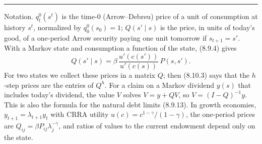 \documentclass[11pt,letterpaper,reqno]{amsart}
\newcommand{\given}{\mid}
\newcommand{\bk}[1]{\textup{\textsc{#1}}}
\begin{document}
\bigskip
\hrule
\bigskip

Notation.  $q^0_t(s^t)$ is the time-0 (Arrow--Debreu) price of a unit of consumption at history $s^t$, normalized by $q^0_0(s_0)=1$; $Q(s'\given s)$ is the
price, in units of today's good, of a one-period Arrow security paying one unit tomorrow if $s_{t+1}=s'$.  With a Markov state and
consumption a function of the state, \bk{(8.9.4)} gives
\[
  Q(s'\given s)=\beta\,\frac{u'(c(s'))}{u'(c(s))}\,P(s,s').
\]
For two states we collect these prices in a matrix $Q$; then \bk{(8.10.3)} says that the $h$-step prices are the entries of $Q^h$.  For
a claim on a Markov dividend $y(s)$ that includes today's dividend, the value $V$ solves $V=y+QV$, so $V=(I-Q)^{-1}y$.  This is also the
formula for the natural debt limits \bk{(8.9.13)}.  In growth economies, $y_{t+1}=\lambda_{t+1}y_t$ with CRRA utility $u(c)=c^{1-\gamma}/(1-\gamma)$, the
one-period prices are $Q_{ij}=\beta P_{ij}\lambda_j^{-\gamma}$, and ratios of values to the current endowment depend only on the state.
\end{document}
